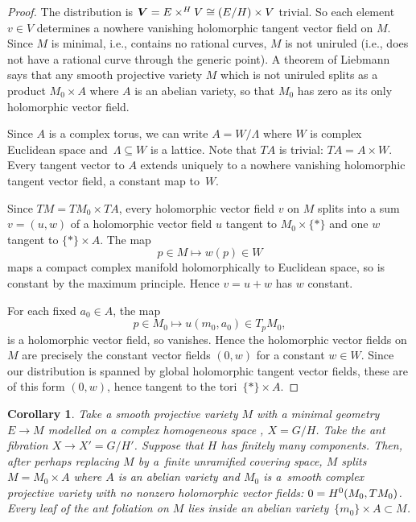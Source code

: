 \documentclass[11pt]{article}
\numberwithin{equation}{section}
\numberwithin{equation}{section}
\newtheorem{Corollary}[Theorem]{Corollary}
\begin{document}
\begin{proof}
The distribution is ${\bm{V}} = E \times^H V \cong \left(E/H\right) \times V$ trivial.
So each element $v \in V$ determines a nowhere vanishing holomorphic tangent vector field on $M$.
Since $M$ is minimal, i.e., contains no rational curves, $M$ is not uniruled (i.e., does not have a rational curve through the generic point).
A theorem of Liebmann \cite[Theorem 1.1]{Pereira/Touzet:2012} says that any smooth projective variety $M$ which is not uniruled splits as a product $M_0\times A$ where $A$ is an abelian variety, so that $M_0$ has zero as its only holomorphic vector field.

Since $A$ is a complex torus, we can write $A=W/\Lambda$ where $W$ is complex Euclidean space and~$\Lambda\subseteq W$ is a lattice.
Note that $TA$ is trivial: $TA=A\times W$.
Every tangent vector to $A$ extends uniquely to a nowhere vanishing holomorphic tangent vector field, a constant map to~$W$.

Since $TM=TM_0\times TA$, every holomorphic vector field $v$ on $M$ splits into a sum $v=(u,w)$ of a holomorphic vector field $u$ tangent to $M_0\times\{*\}$ and one $w$ tangent to $\{*\}\times A$.
The map
\[
p\in M\mapsto w(p)\in W
\]
maps a compact complex manifold holomorphically to Euclidean space, so is constant by the maximum principle.
Hence $v=u+w$ has $w$ constant.

For each fixed $a_0\in A$, the map
\[
p\in M_0\mapsto u(m_0,a_0)\in T_p M_0,
\]
is a holomorphic vector field, so vanishes.
Hence the holomorphic vector fields on $M$ are precisely the constant vector fields $(0,w)$ for a constant $w\in W$.
Since our distribution is spanned by global holomorphic tangent vector fields, these are of this form $(0,w)$, hence tangent to the tori~$\{*\}\times A$.
\end{proof}

\begin{Corollary}\label{cor:splitting}
Take a smooth projective variety $M$ with a minimal geometry $E \to M$ modelled on a complex
homogeneous space , $X = G/H$.
Take the ant fibration $X \to X' = G/H'$.
Suppose that $H$ has finitely many components.
Then, after perhaps replacing $M$ by a~finite unramified covering space, $M$ splits
$M = M_0 \times A$ where $A$ is an abelian variety and $M_0$ is a~smooth complex projective
variety with no nonzero holomorphic vector fields: $0 = \cohomology{0}{M_0,TM_0}$.
Every leaf of the ant foliation on $M$ lies inside an abelian variety~${\{m_0\} \times A \subset M}$.
\end{Corollary}
\end{document}
